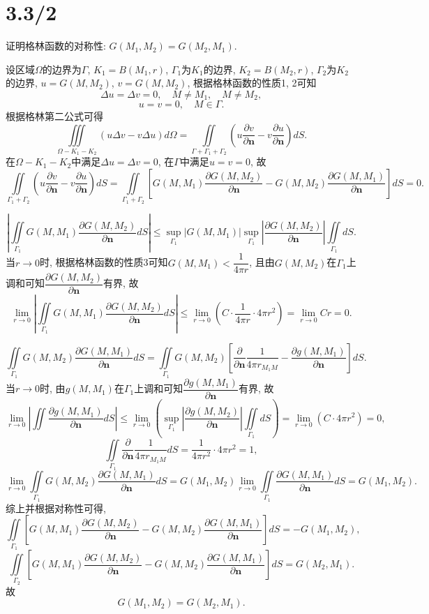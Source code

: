 \documentclass[11pt,a4paper]{article}
\author{刘逸灏 (515370910207)}
\begin{document}
\maketitle
\section{3.3/2}
\begin{problem}
证明格林函数的对称性: $G(M_1,M_2)=G(M_2,M_1)$.
\end{problem}
设区域$\Omega$的边界为$\Gamma$, $K_1=B(M_1,r)$, $\Gamma_1$为$K_1$的边界, $K_2=B(M_2,r)$, $\Gamma_2$为$K_2$的边界, $u=G(M,M_2)$, $v=G(M,M_2)$, 根据格林函数的性质1, 2可知
$$\Delta u=\Delta v=0, \quad M\neq M_1,\quad M\neq M_2,$$
$$u=v=0, \quad M\in\Gamma.$$
根据格林第二公式可得
$$\iiint\limits_{\Omega-K_1-K_2}(u\Delta v-v\Delta u) d\Omega=\iint\limits_{\Gamma+\Gamma_1+\Gamma_2}\left(u\frac{\partial v}{\partial\mathbf{n}}-v\frac{\partial u}{\partial\mathbf{n}}\right)dS.$$
在$\Omega-K_1-K_2$中满足$\Delta u=\Delta v=0$, 在$\Gamma$中满足$u=v=0$, 故
$$\iint\limits_{\Gamma_1+\Gamma_2}\left(u\frac{\partial v}{\partial\mathbf{n}}-v\frac{\partial u}{\partial\mathbf{n}}\right)dS=\iint\limits_{\Gamma_1+\Gamma_2}\left[G(M,M_1)\frac{\partial G(M,M_2)}{\partial\mathbf{n}}-G(M,M_2)\frac{\partial G(M,M_1)}{\partial\mathbf{n}}\right]dS=0.$$

$$\left|\iint\limits_{\Gamma_1}G(M,M_1)\frac{\partial G(M,M_2)}{\partial\mathbf{n}}dS\right|\leqslant\sup_{\Gamma_1}|G(M,M_1)|\sup_{\Gamma_1}\left|\frac{\partial G(M,M_2)}{\partial\mathbf{n}}\right|\iint\limits_{\Gamma_1}dS.$$
当$r\to0$时, 根据格林函数的性质3可知$G(M,M_1)<\dfrac{1}{4\pi r}$, 且由$G(M,M_2)$在$\Gamma_1$上调和可知$\dfrac{\partial G(M,M_2)}{\partial\mathbf{n}}$有界, 故
$$\lim_{r\to0}\left|\iint\limits_{\Gamma_1}G(M,M_1)\frac{\partial G(M,M_2)}{\partial\mathbf{n}}dS\right|\leqslant \lim_{r\to0}\left( C\cdot \frac{1}{4\pi r} \cdot 4\pi r^2\right)=\lim_{r\to0} Cr= 0.$$

$$\iint\limits_{\Gamma_1}G(M,M_2)\frac{\partial G(M,M_1)}{\partial\mathbf{n}}dS=\iint\limits_{\Gamma_1}G(M,M_2)\left[\frac{\partial}{\partial\mathbf{n}}\frac{1}{4\pi r_{M_1M}}-\frac{\partial g(M,M_1)}{\partial\mathbf{n}}\right]dS.$$
当$r\to0$时, 由$g(M,M_1)$在$\Gamma_1$上调和可知$\dfrac{\partial g(M,M_1)}{\partial\mathbf{n}}$有界, 故
$$\lim_{r\to0}\left|\iint\frac{\partial g(M,M_1)}{\partial\mathbf{n}}dS\right|\leqslant \lim_{r\to 0}\left(\sup_{\Gamma_1}\left|\frac{\partial g(M,M_2)}{\partial\mathbf{n}}\right|\iint\limits_{\Gamma_1}dS\right)=\lim_{r\to0}(C\cdot 4\pi r^2)=0,$$
$$\iint\limits_{\Gamma_1}\frac{\partial}{\partial\mathbf{n}}\frac{1}{4\pi r_{M_1M}}dS=\frac{1}{4\pi r^2}\cdot 4\pi r^2=1,$$
$$\lim_{r\to 0}\iint\limits_{\Gamma_1}G(M,M_2)\frac{\partial G(M,M_1)}{\partial\mathbf{n}}dS=G(M_1,M_2)\lim_{r\to 0}\iint\limits_{\Gamma_1}\frac{\partial G(M,M_1)}{\partial\mathbf{n}}dS=G(M_1,M_2).$$
综上并根据对称性可得,
$$\iint\limits_{\Gamma_1}\left[G(M,M_1)\frac{\partial G(M,M_2)}{\partial\mathbf{n}}-G(M,M_2)\frac{\partial G(M,M_1)}{\partial\mathbf{n}}\right]dS=-G(M_1,M_2),$$
$$\iint\limits_{\Gamma_2}\left[G(M,M_1)\frac{\partial G(M,M_2)}{\partial\mathbf{n}}-G(M,M_2)\frac{\partial G(M,M_1)}{\partial\mathbf{n}}\right]dS=G(M_2,M_1).$$
故
$$G(M_1,M_2)=G(M_2,M_1).$$
\end{document}
